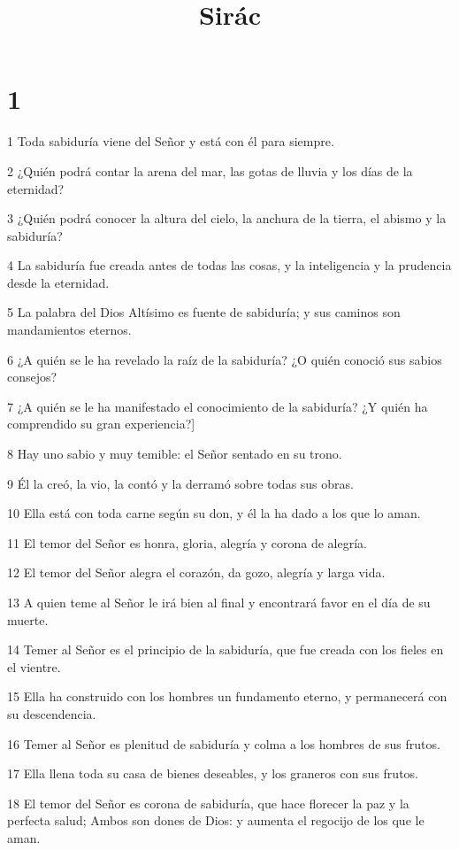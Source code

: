

\title{Sirác}


\chapter{1}

\par 1 Toda sabiduría viene del Señor y está con él para siempre.
\par 2 ¿Quién podrá contar la arena del mar, las gotas de lluvia y los días de la eternidad?
\par 3 ¿Quién podrá conocer la altura del cielo, la anchura de la tierra, el abismo y la sabiduría?
\par 4 La sabiduría fue creada antes de todas las cosas, y la inteligencia y la prudencia desde la eternidad.
\par 5 La palabra del Dios Altísimo es fuente de sabiduría; y sus caminos son mandamientos eternos.
\par 6 ¿A quién se le ha revelado la raíz de la sabiduría? ¿O quién conoció sus sabios consejos?
\par 7 ¿A quién se le ha manifestado el conocimiento de la sabiduría? ¿Y quién ha comprendido su gran experiencia?]
\par 8 Hay uno sabio y muy temible: el Señor sentado en su trono.
\par 9 Él la creó, la vio, la contó y la derramó sobre todas sus obras.
\par 10 Ella está con toda carne según su don, y él la ha dado a los que lo aman.
\par 11 El temor del Señor es honra, gloria, alegría y corona de alegría.
\par 12 El temor del Señor alegra el corazón, da gozo, alegría y larga vida.
\par 13 A quien teme al Señor le irá bien al final y encontrará favor en el día de su muerte.
\par 14 Temer al Señor es el principio de la sabiduría, que fue creada con los fieles en el vientre.
\par 15 Ella ha construido con los hombres un fundamento eterno, y permanecerá con su descendencia.
\par 16 Temer al Señor es plenitud de sabiduría y colma a los hombres de sus frutos.
\par 17 Ella llena toda su casa de bienes deseables, y los graneros con sus frutos.
\par 18 El temor del Señor es corona de sabiduría, que hace florecer la paz y la perfecta salud; Ambos son dones de Dios: y aumenta el regocijo de los que le aman.
